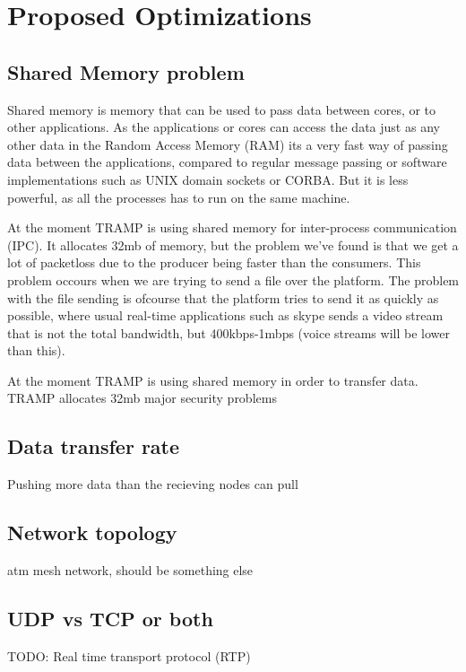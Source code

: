 \section{Proposed Optimizations}
\label{sec:optimizations}

\subsection{Shared Memory problem}
Shared memory is memory that can be used to pass data between cores, or to other applications. As the applications or cores can access the data just as any other data in the Random Access Memory (RAM) its a very fast way of passing data between the applications, compared to regular message passing or software implementations such as UNIX domain sockets or CORBA. But it is less powerful, as all the processes has to run on the same machine.

At the moment TRAMP is using shared memory for inter-process communication (IPC). It allocates 32mb of memory, but the problem we've found is that we get a lot of packetloss due to the producer being faster than the consumers. This problem occours when we are trying to send a file over the platform. The problem with the file sending is ofcourse that the platform tries to send it as quickly as possible, where usual real-time applications such as skype sends a video stream that is not the total bandwidth, but 400kbps-1mbps (voice streams will be lower than this).

At the moment TRAMP is using shared memory in order to transfer data. TRAMP allocates 32mb
major security problems\cite{shared_memory}

\subsection{Data transfer rate}
Pushing more data than the recieving nodes can pull

\subsection{Network topology}
atm mesh network, should be something else

\subsection{UDP vs TCP or both}
TODO: Real time transport protocol (RTP)





